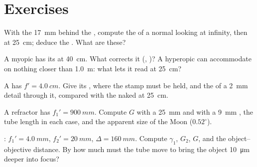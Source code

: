 \section{Exercises}

\begin{exercise}[$\star$]\label{exo:b1:optical-instruments:1}
With the  \qty{17}{mm} behind the , compute the  of a
normal  looking at infinity, then at \qty{25}{cm}; deduce the
. What  are these?
\end{exercise}

\begin{exercise}[$\star$]\label{exo:b1:optical-instruments:2}
A myopic  has its  at \qty{40}{cm}. What  corrects it
(, )? A hyperopic  can accommodate on nothing
closer than \qty{1.0}{m}: what  lets it read at \qty{25}{cm}?
\end{exercise}

\begin{exercise}[$\star$]\label{exo:b1:optical-instruments:3}
A  has $f' = \qty{4.0}{cm}$. Give its ,
where the stamp must be held, and the  of a \qty{2}{mm}
detail through it, compared with the naked  at \qty{25}{cm}.
\end{exercise}

\begin{exercise}[$\star$]\label{exo:b1:optical-instruments:4}
A refractor has $f_1' = \qty{900}{mm}$. Compute $G$ with a \qty{25}{mm}
and with a \qty{9}{mm} , the tube length in each case, and the
apparent size of the Moon ($0.52^\circ$).
\end{exercise}

\begin{exercise}[$\star\star$]\label{exo:b1:optical-instruments:5}
: $f_1' = \qty{4.0}{mm}$, $f_2' = \qty{20}{mm}$,
$\Delta = \qty{160}{mm}$. Compute $\gamma_1$, $G_2$, $G$, and the
object--objective distance. By how much must the tube move to bring the
object \qty{10}{\micro m} deeper into focus?
\end{exercise}

